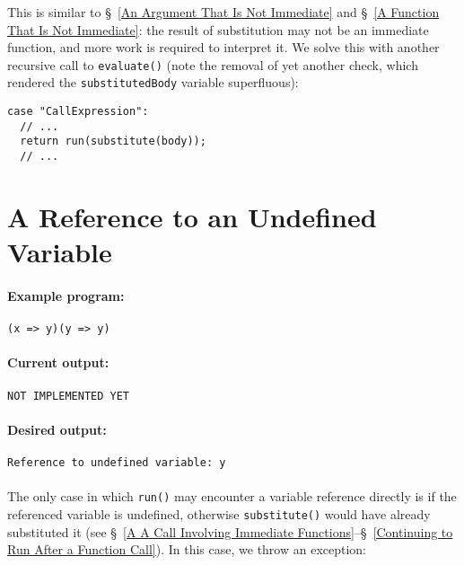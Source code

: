\documentclass[12pt, oneside]{book}
\begin{document}
This is similar to §~\ref{An Argument That Is Not Immediate} and §~\ref{A Function That Is Not Immediate}: the result of substitution may not be an immediate function, and more work is required to interpret it. We solve this with another recursive call to \texttt{evaluate()} (note the removal of yet another check, which rendered the \texttt{substitutedBody} variable superfluous):

\begin{verbatim}
case "CallExpression":
  // ...
  return run(substitute(body));
  // ...
\end{verbatim}

\section{A Reference to an Undefined Variable}

\paragraph{Example program:}

\begin{verbatim}
(x => y)(y => y)
\end{verbatim}

\paragraph{Current output:}

\begin{verbatim}
NOT IMPLEMENTED YET
\end{verbatim}

\paragraph{Desired output:}

\begin{verbatim}
Reference to undefined variable: y
\end{verbatim}

\paragraph{}

The only case in which \texttt{run()} may encounter a variable reference directly is if the referenced variable is undefined, otherwise \texttt{substitute()} would have already substituted it (see §~\ref{A A Call Involving Immediate Functions}–§~\ref{Continuing to Run After a Function Call}). In this case, we throw an exception:
\end{document}
